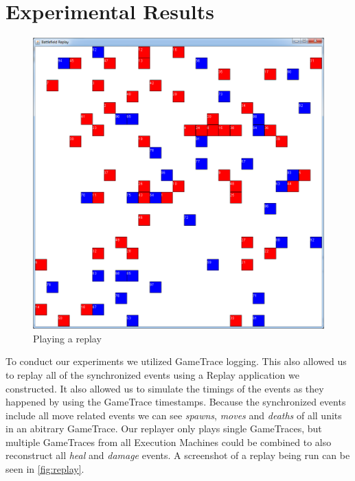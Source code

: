 \documentclass[a4paper,10pt]{article}
\begin{document}
\section{Experimental Results}
\label{sec:results}
\begin{figure}
\begin{framed}
    \begin{center}
        \includegraphics[width=\textwidth]{replay.png}    
    \end{center}
    \caption{Playing a replay}
    \label{fig:replay}
\end{framed}
\end{figure}

To conduct our experiments we utilized GameTrace logging.
This also allowed us to replay all of the synchronized events using a Replay application we constructed.
It also allowed us to simulate the timings of the events as they happened by using the GameTrace timestamps.
Because the synchronized events include all move related events we can see \textit{spawns}, \textit{moves} and \textit{deaths} of all units in an abitrary GameTrace.
Our replayer only plays single GameTraces, but multiple GameTraces from all Execution Machines could be combined to also reconstruct all \textit{heal} and \textit{damage} events.
A screenshot of a replay being run can be seen in \autoref{fig:replay}.
\end{document}

